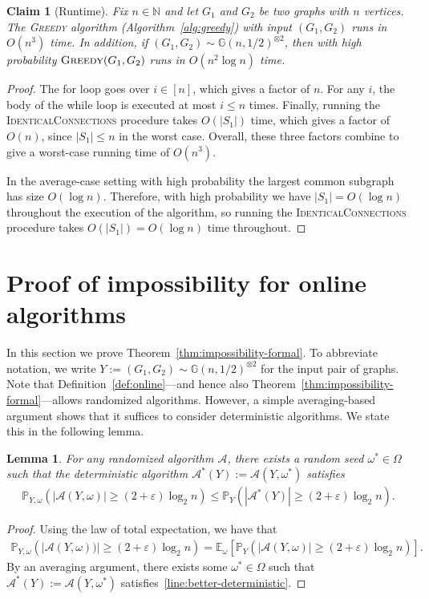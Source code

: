 \documentclass[11pt]{article}
\theoremstyle{plain}
\newtheorem{lemma}{Lemma}
\newtheorem{claim}{Claim}
\theoremstyle{definition}
\theoremstyle{remark}
\newcommand{\Gnhalf}{\mathbb{G}(n,1/2)}
\newcommand{\greedy}{\textsc{Greedy} }
\newcommand{\E}{\mathbb{E}}
\newcommand{\N}{\mathbb{N}}
\newcommand{\eps}{\varepsilon}
\newcommand{\Alg}{\mathcal{A}}
\renewcommand{\Pr}{\mathbb{P}}
\begin{document}
\begin{claim}[Runtime]\label{clm:runtime}
    Fix $n \in \N$ and let $G_{1}$ and $G_{2}$ be two graphs with $n$ vertices. 
    The \greedy algorithm (Algorithm~\ref{alg:greedy}) with input $(G_{1}, G_{2})$ runs in $O(n^{3})$ time. 
    In addition, if $(G_{1}, G_{2}) \sim \Gnhalf^{\otimes 2}$, 
    then with high probability $\greedy(G_{1}, G_{2})$ runs in $O(n^{2} \log n)$ time. 
\end{claim}
\begin{proof}
    The \textsf{for} loop goes over $i \in [n]$, which gives a factor of $n$. For any $i$, the body of the \textsf{while} loop is executed at most $i \leq n$ times. Finally, running the \textsc{IdenticalConnections} procedure takes $O(|S_{1}|)$ time, which gives a factor of $O(n)$, since $|S_{1}| \leq n$ in the worst case. Overall, these three factors combine to give a worst-case running time of $O(n^{3})$. 

    In the average-case setting with high probability the largest common subgraph has size $O(\log n)$. Therefore, with high probability we have $|S_{1}| = O(\log n)$ throughout the execution of the algorithm, so running the \textsc{IdenticalConnections} procedure takes $O(|S_{1}|) = O(\log n)$ time throughout. 
\end{proof}



\section{Proof of impossibility for online algorithms}\label{sec:impossibility-proof}
In this section we prove Theorem~\ref{thm:impossibility-formal}. 
To abbreviate notation, we write 
$Y := (G_{1}, G_{2}) \sim \Gnhalf^{\otimes 2}$
for the input pair of graphs. 
Note that Definition~\ref{def:online}---and hence also Theorem~\ref{thm:impossibility-formal}---allows randomized algorithms. However, a simple averaging-based argument shows that it suffices to consider deterministic algorithms. 
We state this in the following lemma. 


\begin{lemma}\label{lem:exists-deterministic}
    For any randomized algorithm $\Alg$, 
    there exists a random seed $\omega^* \in \Omega$ such that the deterministic algorithm $\Alg^{*}(Y) := \Alg(Y, \omega^*)$ satisfies
    \begin{align}
        \Pr_{Y, \omega}(|\Alg(Y, \omega)| \geq (2 + \eps) \log_2 n) \leq \Pr_{Y}(|\Alg^{*}(Y)| \geq (2 + \eps)\log_2 n). \label{line:better-deterministic}
    \end{align}
\end{lemma}
\begin{proof}
    Using the law of total expectation, we have that
    \begin{align*}
        \Pr_{Y, \omega}(|\Alg(Y, \omega))| \geq (2 + \eps)\log_2 n) = \E_\omega[\Pr_Y(|\Alg(Y, \omega)| \geq (2 + \eps)\log_2 n)].
    \end{align*}
    By an averaging argument, there exists some $\omega^* \in \Omega$ such that $\Alg^{*}(Y) := \Alg(Y, \omega^*)$ satisfies~\eqref{line:better-deterministic}.
\end{proof}
\end{document}
